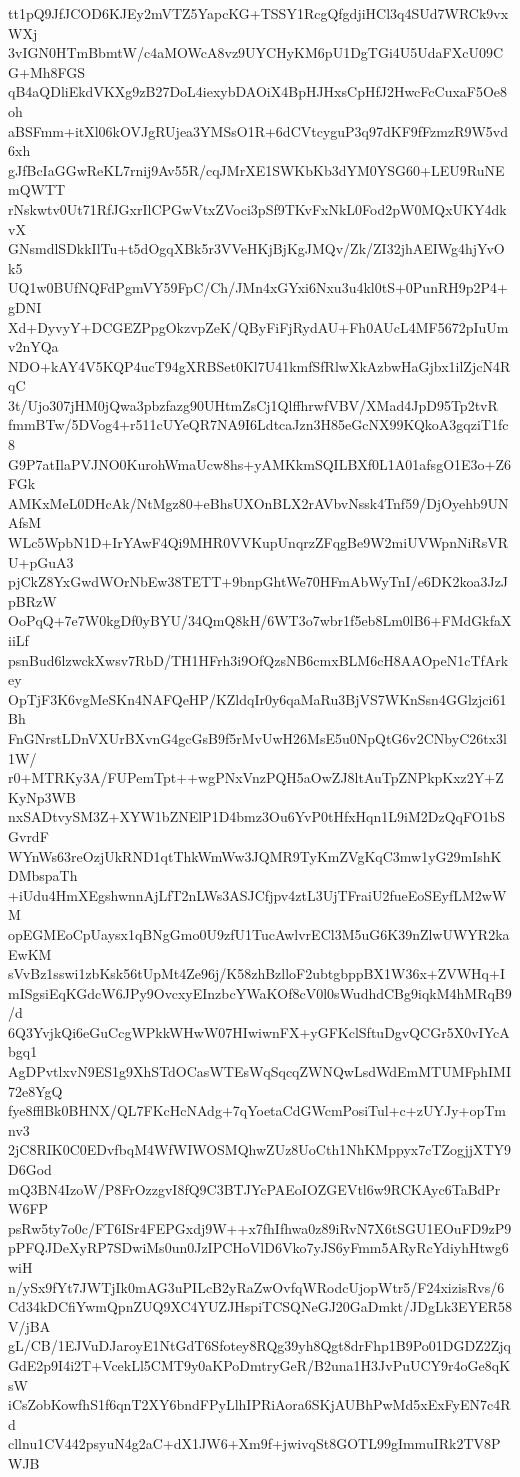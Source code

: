 tt1pQ9JfJCOD6KJEy2mVTZ5YapcKG+TSSY1RcgQfgdjiHCl3q4SUd7WRCk9vxWXj
3vIGN0HTmBbmtW/c4aMOWcA8vz9UYCHyKM6pU1DgTGi4U5UdaFXcU09CG+Mh8FGS
qB4aQDliEkdVKXg9zB27DoL4iexybDAOiX4BpHJHxsCpHfJ2HwcFcCuxaF5Oe8oh
aBSFmm+itXl06kOVJgRUjea3YMSsO1R+6dCVtcyguP3q97dKF9fFzmzR9W5vd6xh
gJfBcIaGGwReKL7rnij9Av55R/cqJMrXE1SWKbKb3dYM0YSG60+LEU9RuNEmQWTT
rNskwtv0Ut71RfJGxrIlCPGwVtxZVoci3pSf9TKvFxNkL0Fod2pW0MQxUKY4dkvX
GNsmdlSDkkIlTu+t5dOgqXBk5r3VVeHKjBjKgJMQv/Zk/ZI32jhAEIWg4hjYvOk5
UQ1w0BUfNQFdPgmVY59FpC/Ch/JMn4xGYxi6Nxu3u4kl0tS+0PunRH9p2P4+gDNI
Xd+DyvyY+DCGEZPpgOkzvpZeK/QByFiFjRydAU+Fh0AUcL4MF5672pIuUmv2nYQa
NDO+kAY4V5KQP4ucT94gXRBSet0Kl7U41kmfSfRlwXkAzbwHaGjbx1ilZjcN4RqC
3t/Ujo307jHM0jQwa3pbzfazg90UHtmZsCj1QlffhrwfVBV/XMad4JpD95Tp2tvR
fmmBTw/5DVog4+r511cUYeQR7NA9I6LdtcaJzn3H85eGcNX99KQkoA3gqziT1fc8
G9P7atIlaPVJNO0KurohWmaUcw8hs+yAMKkmSQILBXf0L1A01afsgO1E3o+Z6FGk
AMKxMeL0DHcAk/NtMgz80+eBhsUXOnBLX2rAVbvNssk4Tnf59/DjOyehb9UNAfsM
WLc5WpbN1D+IrYAwF4Qi9MHR0VVKupUnqrzZFqgBe9W2miUVWpnNiRsVRU+pGuA3
pjCkZ8YxGwdWOrNbEw38TETT+9bnpGhtWe70HFmAbWyTnI/e6DK2koa3JzJpBRzW
OoPqQ+7e7W0kgDf0yBYU/34QmQ8kH/6WT3o7wbr1f5eb8Lm0lB6+FMdGkfaXiiLf
psnBud6lzwckXwsv7RbD/TH1HFrh3i9OfQzsNB6cmxBLM6cH8AAOpeN1cTfArkey
OpTjF3K6vgMeSKn4NAFQeHP/KZldqIr0y6qaMaRu3BjVS7WKnSsn4GGlzjci61Bh
FnGNrstLDnVXUrBXvnG4gcGsB9f5rMvUwH26MsE5u0NpQtG6v2CNbyC26tx3l1W/
r0+MTRKy3A/FUPemTpt++wgPNxVnzPQH5aOwZJ8ltAuTpZNPkpKxz2Y+ZKyNp3WB
nxSADtvySM3Z+XYW1bZNElP1D4bmz3Ou6YvP0tHfxHqn1L9iM2DzQqFO1bSGvrdF
WYnWs63reOzjUkRND1qtThkWmWw3JQMR9TyKmZVgKqC3mw1yG29mIshKDMbspaTh
+iUdu4HmXEgshwnnAjLfT2nLWs3ASJCfjpv4ztL3UjTFraiU2fueEoSEyfLM2wWM
opEGMEoCpUaysx1qBNgGmo0U9zfU1TucAwlvrECl3M5uG6K39nZlwUWYR2kaEwKM
sVvBz1sswi1zbKsk56tUpMt4Ze96j/K58zhBzlloF2ubtgbppBX1W36x+ZVWHq+I
mISgsiEqKGdcW6JPy9OvcxyEInzbcYWaKOf8cV0l0sWudhdCBg9iqkM4hMRqB9/d
6Q3YvjkQi6eGuCcgWPkkWHwW07HIwiwnFX+yGFKclSftuDgvQCGr5X0vIYcAbgq1
AgDPvtlxvN9ES1g9XhSTdOCasWTEsWqSqcqZWNQwLsdWdEmMTUMFphIMI72e8YgQ
fye8fflBk0BHNX/QL7FKcHcNAdg+7qYoetaCdGWcmPosiTul+c+zUYJy+opTmnv3
2jC8RIK0C0EDvfbqM4WfWIWOSMQhwZUz8UoCth1NhKMppyx7cTZogjjXTY9D6God
mQ3BN4IzoW/P8FrOzzgvI8fQ9C3BTJYcPAEoIOZGEVtl6w9RCKAyc6TaBdPrW6FP
psRw5ty7o0c/FT6ISr4FEPGxdj9W++x7fhIfhwa0z89iRvN7X6tSGU1EOuFD9zP9
pPFQJDeXyRP7SDwiMs0un0JzIPCHoVlD6Vko7yJS6yFmm5ARyRcYdiyhHtwg6wiH
n/ySx9fYt7JWTjIk0mAG3uPILcB2yRaZwOvfqWRodcUjopWtr5/F24xizisRvs/6
Cd34kDCfiYwmQpnZUQ9XC4YUZJHspiTCSQNeGJ20GaDmkt/JDgLk3EYER58V/jBA
gL/CB/1EJVuDJaroyE1NtGdT6Sfotey8RQg39yh8Qgt8drFhp1B9Po01DGDZ2Zjq
GdE2p9I4i2T+VcekLl5CMT9y0aKPoDmtryGeR/B2una1H3JvPuUCY9r4oGe8qKsW
iCsZobKowfhS1f6qnT2XY6bndFPyLlhIPRiAora6SKjAUBhPwMd5xExFyEN7c4Rd
cllnu1CV442psyuN4g2aC+dX1JW6+Xm9f+jwivqSt8GOTL99gImmuIRk2TV8PWJB
